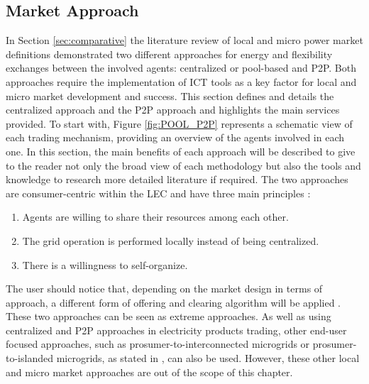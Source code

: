 \subsection{Market Approach} \label{sec:marketapproach}

In Section \ref{sec:comparative} the literature review of local and micro power market definitions demonstrated two different
approaches for energy and flexibility exchanges between the involved agents: centralized or pool-based and P2P. Both approaches require the implementation of ICT tools as a key factor for local and micro market development and success. This section defines and details the centralized approach and the P2P approach and highlights the main services provided. To start with, Figure \ref{fig:POOL_P2P} represents a schematic view of each trading mechanism, providing an overview of the agents involved in each one. In this section, the main benefits of each approach will be described to give to the reader not only the broad view of each methodology but also the tools and knowledge to research more detailed literature if required. The two approaches are consumer-centric within the LEC and have three main principles \cite{sousa2018peer}:

\begin{enumerate}
\item Agents are willing to share their resources among each other.
\item The grid operation is performed locally instead of being centralized.
\item There is a willingness to self-organize.
\end{enumerate}

The user should notice that, depending on the market design in terms of approach, a different form of offering and clearing algorithm will be applied \cite{Pinson2017}. These two approaches can be seen as extreme approaches. As well as using centralized and P2P approaches in electricity products trading, other end-user focused approaches, such as prosumer-to-interconnected microgrids or prosumer-to-islanded microgrids, as stated in \cite{parag2016electricity}, can also be used. However, these other local and micro market approaches are out of the scope of this chapter.

